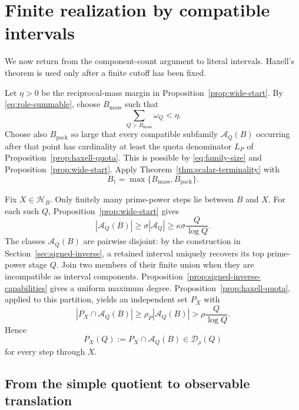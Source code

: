 \section{Finite realization by compatible intervals}
\label{sec:finite-realization}

We now return from the component-count argument to literal intervals.  Haxell's theorem is used only after a finite cutoff has been fixed.

Let $\eta>0$ be the reciprocal-mass margin in Proposition~\ref{prop:wide-start}.  By \eqref{eq:role-summable}, choose $B_{\mathrm{mass}}$ such that
\begin{equation}\label{eq:resource-tail}
\sum_{Q>B_{\mathrm{mass}}}\omega_Q<\eta.
\end{equation}
Choose also $B_{\mathrm{pack}}$ so large that every compatible subfamily $\mathcal A_Q(B)$ occurring after that point has cardinality at least the quota denominator $L_P$ of Proposition~\ref{prop:haxell-quota}.  This is possible by \eqref{eq:family-size} and Proposition~\ref{prop:wide-start}.  Apply Theorem~\ref{thm:scalar-terminality} with
\begin{equation}\label{eq:global-start-cutoff}
B_\dagger=\max\{B_{\mathrm{mass}},B_{\mathrm{pack}}\}.
\end{equation}

Fix $X\in\mathcal H_B$.  Only finitely many prime-power steps lie between $B$ and $X$.  For each such $Q$, Proposition~\ref{prop:wide-start} gives
\begin{equation}\label{eq:survivor-density}
|\mathcal A_Q(B)|
\ge\sigma|\mathcal A_Q|
\ge\kappa\sigma\frac Q{\log Q}.
\end{equation}
The classes $\mathcal A_Q(B)$ are pairwise disjoint: by the construction in Section~\ref{sec:signed-inverse}, a retained interval uniquely recovers its top prime-power stage $Q$.  Join two members of their finite union when they are incompatible as interval components.  Proposition~\ref{prop:signed-inverse-capabilities} gives a uniform maximum degree.  Proposition~\ref{prop:haxell-quota}, applied to this partition, yields an independent set $P_X$ with
\begin{equation}\label{eq:packed-density}
|P_X\cap\mathcal A_Q(B)|
\ge\rho_P|\mathcal A_Q(B)|
>\rho\frac Q{\log Q}.
\end{equation}
Hence
\[
P_X(Q):=P_X\cap\mathcal A_Q(B)
\in\mathcal D_\rho(Q)
\]
for every step through $X$.

\subsection{From the simple quotient to observable translation}

